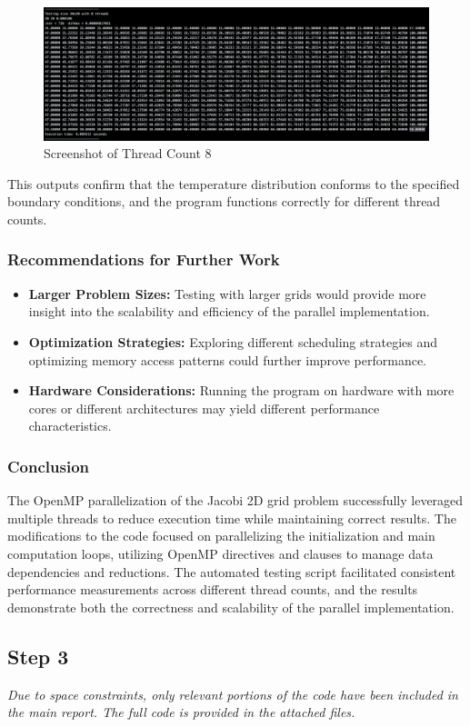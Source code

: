 \documentclass{article}
\begin{document}
\begin{figure}[H]
    \centering
    \includegraphics[width=\linewidth]{Images/Thread8.png}
    \caption{Screenshot of Thread Count 8}
    \label{fig:thread8}
\end{figure}

This outputs confirm that the temperature distribution conforms to the specified boundary conditions, and the program functions correctly for different thread counts.

\subsubsection{Recommendations for Further Work}

\begin{itemize}
    \item \textbf{Larger Problem Sizes:} Testing with larger grids would provide more insight into the scalability and efficiency of the parallel implementation.
    \item \textbf{Optimization Strategies:} Exploring different scheduling strategies and optimizing memory access patterns could further improve performance.
    \item \textbf{Hardware Considerations:} Running the program on hardware with more cores or different architectures may yield different performance characteristics.
\end{itemize}

\subsubsection{Conclusion}

The OpenMP parallelization of the Jacobi 2D grid problem successfully leveraged multiple threads to reduce execution time while maintaining correct results. The modifications to the code focused on parallelizing the initialization and main computation loops, utilizing OpenMP directives and clauses to manage data dependencies and reductions. The automated testing script facilitated consistent performance measurements across different thread counts, and the results demonstrate both the correctness and scalability of the parallel implementation.

\subsection{Step 3}



\printbibliography

\textit{Due to space constraints, only relevant portions of the code have been included in the main report. The full code is provided in the attached files.}
\end{document}
